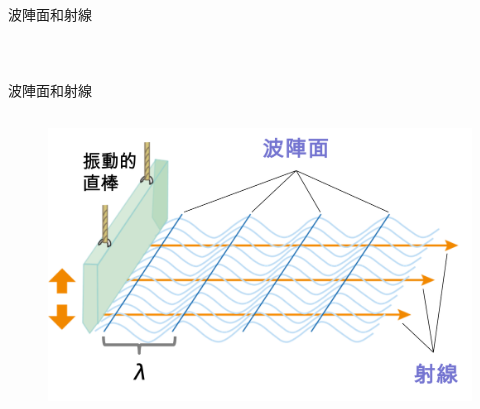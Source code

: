 \documentclass[13pt]{beamer}
\begin{document}
\begin{frame}{波陣面和射線}
\begin{columns}
\begin{figure}
        \end{figure}


    \end{columns}
\end{frame}

\begin{frame}{波陣面和射線}
    \begin{columns}
        \begin{figure}
            \centering
            \includegraphics[width=1\linewidth]{images/3.png}


        \end{figure}


\end{columns}
\end{frame}
\end{document}
